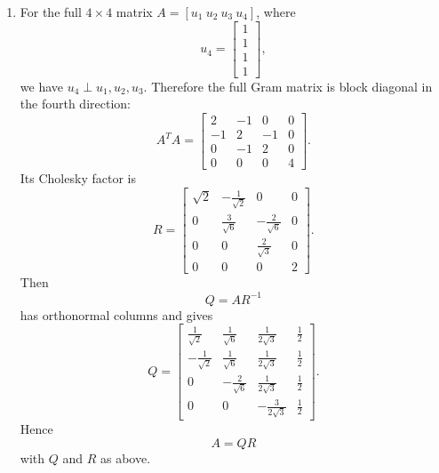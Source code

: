 \documentclass[12pt]{article}
\begin{document}
\begin{enumerate}[label=(\alph*)]
  \item For the full $4\times4$ matrix $A=[u_1\ u_2\ u_3\ u_4]$, where
  \[
  u_4=\begin{bmatrix}1\\1\\1\\1\end{bmatrix},
  \]
  we have $u_4\perp u_1,u_2,u_3$. Therefore the full Gram matrix is block diagonal in the fourth direction:
  \[
  A^TA=\begin{bmatrix}
  2&-1&0&0\\
  -1&2&-1&0\\
  0&-1&2&0\\
  0&0&0&4
  \end{bmatrix}.
  \]
  Its Cholesky factor is
  \[
  R=\begin{bmatrix}
  \sqrt2&-\frac1{\sqrt2}&0&0\\[0.3em]
  0&\frac3{\sqrt6}&-\frac2{\sqrt6}&0\\[0.3em]
  0&0&\frac2{\sqrt3}&0\\[0.3em]
  0&0&0&2
  \end{bmatrix}.
  \]
  Then
  \[
  Q=AR^{-1}
  \]
  has orthonormal columns and gives
  \[
  Q=\begin{bmatrix}
  \frac1{\sqrt2}&\frac1{\sqrt6}&\frac1{2\sqrt3}&\frac12\\[0.3em]
  -\frac1{\sqrt2}&\frac1{\sqrt6}&\frac1{2\sqrt3}&\frac12\\[0.3em]
  0&-\frac2{\sqrt6}&\frac1{2\sqrt3}&\frac12\\[0.3em]
  0&0&-\frac3{2\sqrt3}&\frac12
  \end{bmatrix}.
  \]
  Hence
  \[
  \boxed{A=QR}
  \]
  with $Q$ and $R$ as above.
\end{enumerate}

\newpage
\end{document}
